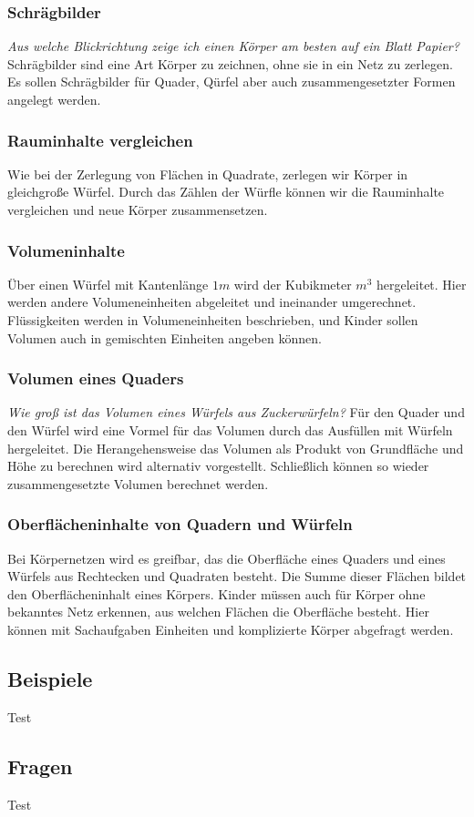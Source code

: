 \documentclass{article}
\begin{document}
\subsubsection*{ Schrägbilder}
\textit{Aus welche Blickrichtung zeige ich einen Körper am besten auf ein Blatt Papier?}
Schrägbilder sind eine Art Körper zu zeichnen, ohne sie in ein Netz zu zerlegen. Es sollen Schrägbilder für Quader, Qürfel aber auch zusammengesetzter Formen angelegt werden.
\subsubsection*{ Rauminhalte vergleichen}
Wie bei der Zerlegung von Flächen in Quadrate, zerlegen wir Körper in gleichgroße Würfel. Durch das Zählen der Würfle können wir die Rauminhalte vergleichen und neue Körper zusammensetzen. 
\subsubsection*{ Volumeninhalte}
Über einen Würfel mit Kantenlänge $1m$ wird der Kubikmeter $m^3$ hergeleitet. Hier werden andere Volumeneinheiten abgeleitet und ineinander umgerechnet. Flüssigkeiten werden in Volumeneinheiten beschrieben, und Kinder sollen Volumen auch in gemischten Einheiten angeben können.
\subsubsection*{ Volumen eines Quaders}
\textit{Wie groß ist das Volumen eines Würfels aus Zuckerwürfeln?}
Für den Quader und den Würfel wird eine Vormel für das Volumen durch das Ausfüllen mit Würfeln hergeleitet. Die Herangehensweise das Volumen als Produkt von Grundfläche und Höhe zu berechnen wird alternativ vorgestellt.
Schließlich können so wieder zusammengesetzte Volumen berechnet werden.
\subsubsection*{Oberflächeninhalte von Quadern und Würfeln}
Bei Körpernetzen wird es greifbar, das die Oberfläche eines Quaders und eines Würfels aus Rechtecken und Quadraten besteht. Die Summe dieser Flächen bildet den Oberflächeninhalt eines Körpers.
Kinder müssen auch für Körper ohne bekanntes Netz erkennen, aus welchen Flächen die Oberfläche besteht. Hier können mit Sachaufgaben Einheiten und komplizierte Körper abgefragt werden.
\subsection{Beispiele}
\begin{tcolorbox}[colback=gray!5!white,colframe=gray!25!black]
Test
\end{tcolorbox}
\subsection{Fragen}
\begin{tcolorbox}[colback=blue!5!white,colframe=blue!25!black]
Test
\end{tcolorbox}
\end{document}
